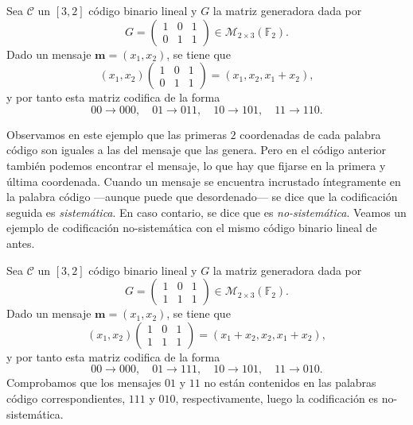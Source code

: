 \begin{example}
  Sea \(\mathcal C\) un \([3, 2]\) código binario lineal y \(G\) la matriz generadora dada por 
  \[
    G = \begin{pmatrix}
      1 & 0 & 1 \\ 0 & 1 & 1
    \end{pmatrix} \in \mathcal M_{2 \times 3}(\mathbb F_2).
  \]
  Dado un mensaje \(\mathbf{m} = (x_1, x_2)\), se tiene que \[(x_1, x_2) \begin{pmatrix}
    1 & 0 & 1 \\ 0 & 1 & 1
  \end{pmatrix} = (x_1, x_2, x_1 + x_2),\] y por tanto esta matriz codifica de la forma \[00 \to 000, \quad 01 \to 011,\quad 10 \to 101,\quad 11 \to 110.\]
\end{example}

Observamos en este ejemplo que las primeras \(2\) coordenadas de cada palabra código son iguales a las del mensaje que las genera.
Pero en el código anterior también podemos encontrar el mensaje, lo que hay que fijarse en la primera y última coordenada.
Cuando un mensaje se encuentra incrustado íntegramente en la palabra código —aunque puede que desordenado— se dice que la codificación seguida es \textit{sistemática}.
En caso contario, se dice que es \textit{no-sistemática}.
Veamos un ejemplo de codificación no-sistemática con el mismo código binario lineal de antes.

\begin{example}
  \label{ej:codificacion-no-sistematica}
  Sea \(\mathcal C\) un \([3, 2]\) código binario lineal y \(G\) la matriz generadora dada por 
  \[
    G = \begin{pmatrix}
      1 & 0 & 1 \\ 1 & 1 & 1
    \end{pmatrix} \in \mathcal M_{2 \times 3}(\mathbb F_2).
  \]
  Dado un mensaje \(\mathbf{m} = (x_1, x_2)\), se tiene que \[(x_1, x_2) \begin{pmatrix}
    1 & 0 & 1 \\ 1 & 1 & 1
  \end{pmatrix} = (x_1 + x_2, x_2, x_1 + x_2),\] y por tanto esta matriz codifica de la forma \[00 \to 000, \quad 01 \to 111,\quad 10 \to 101,\quad 11 \to 010.\]
  Comprobamos que los mensajes \(01\) y \(11\) no están contenidos en las palabras código correspondientes, \(111\) y \(010\), respectivamente, luego la codificación es no-sistemática.
\end{example}


